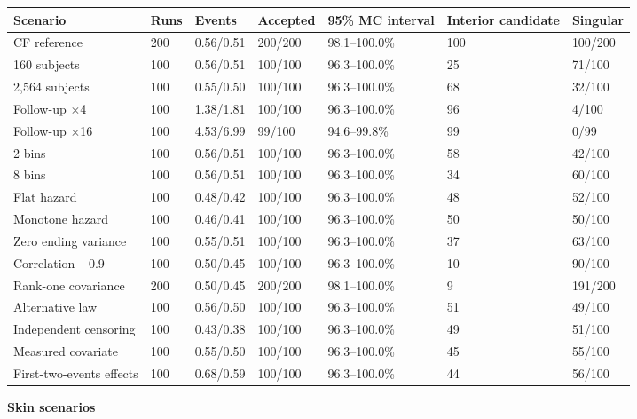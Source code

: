 \documentclass[11pt]{article}
\begin{document}
{\scriptsize\setlength{\tabcolsep}{4pt}
\begin{longtable}{lllllll}
\toprule
\textbf{Scenario} & \textbf{Runs} & \textbf{Events} & \textbf{Accepted} & \textbf{95\% MC interval} & \textbf{Interior candidate} & \textbf{Singular} \\
\midrule
\endhead
\bottomrule
\endlastfoot
CF reference & 200 & 0.56/0.51 & 200/200 & 98.1--100.0\% & 100 & 100/200 \\
160 subjects & 100 & 0.56/0.51 & 100/100 & 96.3--100.0\% & 25 & 71/100 \\
2,564 subjects & 100 & 0.55/0.50 & 100/100 & 96.3--100.0\% & 68 & 32/100 \\
Follow-up $\times$4 & 100 & 1.38/1.81 & 100/100 & 96.3--100.0\% & 96 & 4/100 \\
Follow-up $\times$16 & 100 & 4.53/6.99 & 99/100 & 94.6--99.8\% & 99 & 0/99 \\
2 bins & 100 & 0.56/0.51 & 100/100 & 96.3--100.0\% & 58 & 42/100 \\
8 bins & 100 & 0.56/0.51 & 100/100 & 96.3--100.0\% & 34 & 60/100 \\
Flat hazard & 100 & 0.48/0.42 & 100/100 & 96.3--100.0\% & 48 & 52/100 \\
Monotone hazard & 100 & 0.46/0.41 & 100/100 & 96.3--100.0\% & 50 & 50/100 \\
Zero ending variance & 100 & 0.55/0.51 & 100/100 & 96.3--100.0\% & 37 & 63/100 \\
Correlation $-$0.9 & 100 & 0.50/0.45 & 100/100 & 96.3--100.0\% & 10 & 90/100 \\
Rank-one covariance & 200 & 0.50/0.45 & 200/200 & 98.1--100.0\% & 9 & 191/200 \\
Alternative law & 100 & 0.56/0.50 & 100/100 & 96.3--100.0\% & 51 & 49/100 \\
Independent censoring & 100 & 0.43/0.38 & 100/100 & 96.3--100.0\% & 49 & 51/100 \\
Measured covariate & 100 & 0.55/0.50 & 100/100 & 96.3--100.0\% & 45 & 55/100 \\
First-two-events effects & 100 & 0.68/0.59 & 100/100 & 96.3--100.0\% & 44 & 56/100 \\
\end{longtable}}

\textbf{Skin scenarios}
\end{document}
